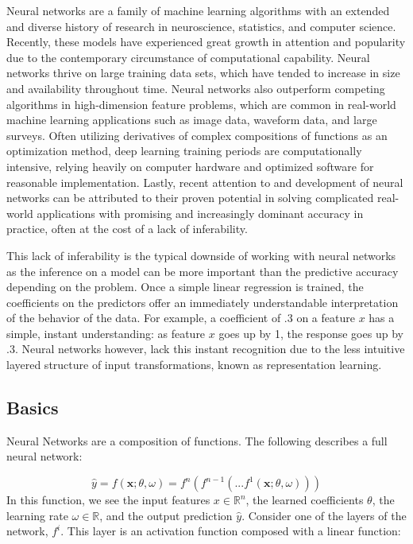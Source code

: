 \documentclass[12pt,twoside]{reedthesis}
\begin{document}
Neural networks are a family of machine learning algorithms with an
extended and diverse history of research in neuroscience, statistics,
and computer science. Recently, these models have experienced great
growth in attention and popularity due to the contemporary circumstance
of computational capability. Neural networks thrive on large training
data sets, which have tended to increase in size and availability
throughout time. Neural networks also outperform competing algorithms in
high-dimension feature problems, which are common in real-world machine
learning applications such as image data, waveform data, and large
surveys. Often utilizing derivatives of complex compositions of
functions as an optimization method, deep learning training periods are
computationally intensive, relying heavily on computer hardware and
optimized software for reasonable implementation. Lastly, recent
attention to and development of neural networks can be attributed to
their proven potential in solving complicated real-world applications
with promising and increasingly dominant accuracy in practice, often at
the cost of a lack of inferability.

This lack of inferability is the typical downside of working with neural
networks as the inference on a model can be more important than the
predictive accuracy depending on the problem. Once a simple linear
regression is trained, the coefficients on the predictors offer an
immediately understandable interpretation of the behavior of the data.
For example, a coefficient of .3 on a feature \(x\) has a simple,
instant understanding: as feature \(x\) goes up by 1, the response goes
up by .3. Neural networks however, lack this instant recognition due to
the less intuitive layered structure of input transformations, known as
representation learning.

\subsection{Basics}\label{basics}

Neural Networks are a composition of functions. The following describes
a full neural network:

\[
\hat y = f(\boldsymbol{x}; \theta, \omega) = f^n ( f^{n-1}  ( ... f^1(\boldsymbol{x}; \theta, \omega)))
\] In this function, we see the input features \(x \in \mathbb{R}^n\),
the learned coefficients \(\theta\), the learning rate
\(\omega \in \mathbb{R}\), and the output prediction \(\hat{y}\).
Consider one of the layers of the network, \(f^i\). This layer is an
activation function composed with a linear function:
\end{document}
